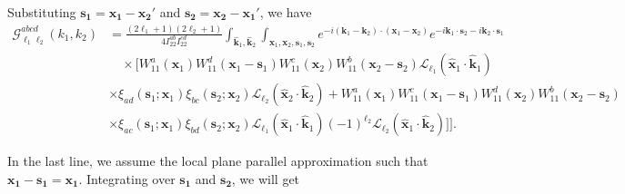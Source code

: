 \documentclass[a4paper,11pt]{article}
\begin{document}
Substituting \(\boldsymbol{s_1} = \boldsymbol{x_1}-\boldsymbol{x_2}'\) and \(\boldsymbol{s_2} = \boldsymbol{x_2}-\boldsymbol{x_1}'\), we have
\begin{equation}
\begin{split}
\mathcal{G}^{abcd}_{\ell_1 \ell_2}(k_1, k_2) &= \frac{(2\ell_1 + 1)(2\ell_2 + 1)}{4I_{22}^{ab} I_{22}^{cd}} \int_{\hat{\mathbf{k}}_1, \hat{\mathbf{k}}_2} \int_{\mathbf{x}_1, \mathbf{x}_2, \mathbf{s}_1, \mathbf{s}_2} e^{-i(\mathbf{k}_1 - \mathbf{k}_2) \cdot (\mathbf{x}_1 - \mathbf{x}_2)} e^{-i\mathbf{k}_1 \cdot \mathbf{s}_2 - i\mathbf{k}_2 \cdot \mathbf{s}_1}  \nonumber\\
&\quad \times\Big[ W^a_{11}(\mathbf{x}_1)W^d_{11}(\mathbf{x}_1 - \mathbf{s}_1)W^c_{11}(\mathbf{x}_2)W^b_{11}(\mathbf{x}_2 - \mathbf{s}_2)\mathcal{L}_{\ell_1}(\hat{\mathbf{x}}_1 \cdot \hat{\mathbf{k}}_1) \nonumber\\
& \times\xi_{ad}(\mathbf{s}_1; \mathbf{x}_1)\xi_{bc}(\mathbf{s}_2; \mathbf{x}_2)\mathcal{L}_{\ell_2}(\hat{\mathbf{x}}_2 \cdot \hat{\mathbf{k}}_2) + W^a_{11}(\mathbf{x}_1)W^c_{11}(\mathbf{x}_1 - \mathbf{s}_1)W^d_{11}(\mathbf{x}_2)W^b_{11}(\mathbf{x}_2 - \mathbf{s}_2) \nonumber\\
& \times \xi_{ac}(\mathbf{s}_1; \mathbf{x}_1)\xi_{bd}(\mathbf{s}_2; \mathbf{x}_2)\mathcal{L}_{\ell_1}(\hat{\mathbf{x}}_1 \cdot \hat{\mathbf{k}}_1)(-1)^{\ell_2}\mathcal{L}_{\ell_2}(\hat{\mathbf{x}}_1 \cdot \hat{\mathbf{k}}_2)]\Big].
\end{split}
\end{equation}

In the last line, we assume the local plane parallel approximation such that \(\boldsymbol{x_1} - \boldsymbol{s_1} = \boldsymbol{x_1}\). Integrating over \(\boldsymbol{s_1}\) and \(\boldsymbol{s_2}\), we will get
\end{document}
